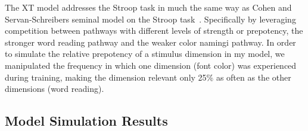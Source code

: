 

The XT model addresses the Stroop task in much the same way as Cohen and Servan-Schreibers seminal model on the Stroop task~\cite{CohenJD:1990:Stroop}.  Specifically by leveraging competition between pathways with different levels of strength or prepotency, the stronger word reading pathway and the weaker color namingi pathway.  In order to simulate the relative prepotency of a stimulus dimension in my model, we manipulated the frequency in which one dimension (font color) was experienced during training, making the dimension relevant only 25\% as often as the other dimensions (word reading).  

\subsection{Model Simulation Results}

